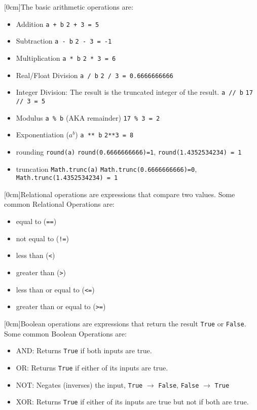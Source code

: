   [0cm]The basic arithmetic operations are:
  \begin{itemize}
    \setlength\itemsep{0em}
    \item Addition \verb|a + b|
      \subitem \verb|2 + 3 = 5|
    \item Subtraction \verb|a - b|
      \subitem \verb|2 - 3 = -1|
    \item Multiplication \verb|a * b|
      \subitem \verb|2 * 3 = 6|
    \item Real/Float Division \verb|a / b|
      \subitem \verb|2 / 3 = 0.6666666666|
    \item Integer Division: The result is the truncated integer of the result. \verb|a // b|
      \subitem \verb|17 // 3 = 5|
    \item Modulus \verb|a % b| (AKA remainder)
      \subitem \verb|17 % 3 = 2|
    \item Exponentiation ($a^b$) \verb|a ** b|
      \subitem \verb|2**3 = 8|
    \item rounding \verb|round(a)|
      \subitem \verb|round(0.6666666666)=1|, \verb|round(1.4352534234) = 1|
    \item truncation \verb|Math.trunc(a)|
      \subitem \verb|Math.trunc(0.6666666666)=0|, \verb|Math.trunc(1.4352534234) = 1|
  \end{itemize}
  [0cm]Relational operations are expressions that compare two values. Some common Relational Operations are:
  \begin{itemize}
    \setlength\itemsep{0em}
    \item equal to (\verb|==|)
    \item not equal to (\verb|!=|)
    \item less than (\verb|<|)
    \item greater than (\verb|>|)
    \item less than or equal to (\verb|<=|)
    \item greater than or equal to (\verb|>=|)
  \end{itemize}
  [0cm]Boolean operations are expressions that return the result \verb|True| or \verb|False|. Some common Boolean Operations are:
  \begin{itemize}
    \setlength\itemsep{0em}
    \item AND: Returns \verb|True| if both inputs are true.
    \item OR: Returns \verb|True| if either of its inputs are true.
    \item NOT: Negates (inverses) the input, \verb|True| $\to$ \verb|False|, \verb|False| $\to$ \verb|True|
    \item XOR: Returns \verb|True| if either of its inputs are true but not if both are true.
  \end{itemize}
